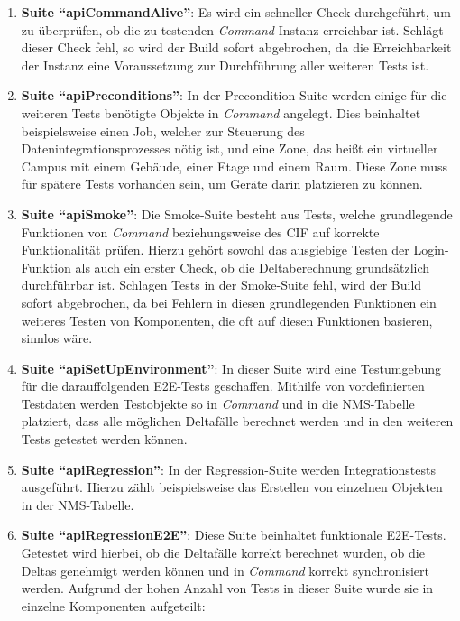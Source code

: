 \begin{enumerate}
    \item \textbf{Suite \enquote{apiCommandAlive}}: Es wird ein schneller Check durchgeführt, um zu überprüfen, ob die zu testenden \textit{Command}-Instanz erreichbar ist. Schlägt dieser Check fehl, so wird der Build sofort abgebrochen, da die Erreichbarkeit der Instanz eine Voraussetzung zur Durchführung aller weiteren Tests ist.
    \item \textbf{Suite \enquote{apiPreconditions}}: In der Precondition-Suite werden einige für die weiteren Tests benötigte Objekte in \textit{Command} angelegt. Dies beinhaltet beispielsweise einen Job, welcher zur Steuerung des Datenintegrationsprozesses nötig ist, und eine Zone, das heißt ein virtueller Campus mit einem Gebäude, einer Etage und einem Raum. Diese Zone muss für spätere Tests vorhanden sein, um Geräte darin platzieren zu können.
    \item \textbf{Suite \enquote{apiSmoke}}: Die Smoke-Suite besteht aus Tests, welche grundlegende Funktionen von \textit{Command} beziehungsweise des \ac{CIF} auf korrekte Funktionalität prüfen. Hierzu gehört sowohl das ausgiebige Testen der Login-Funktion als auch ein erster Check, ob die Deltaberechnung grundsätzlich durchführbar ist. Schlagen Tests in der Smoke-Suite fehl, wird der Build sofort abgebrochen, da bei Fehlern in diesen grundlegenden Funktionen ein weiteres Testen von Komponenten, die oft auf diesen Funktionen basieren, sinnlos wäre.
    \item \textbf{Suite \enquote{apiSetUpEnvironment}}: In dieser Suite wird eine Testumgebung für die darauffolgenden \ac{E2E}-Tests geschaffen. Mithilfe von vordefinierten Testdaten werden Testobjekte so in \textit{Command} und in die \ac{NMS}-Tabelle platziert, dass alle möglichen Deltafälle berechnet werden und in den weiteren Tests getestet werden können.
    \item \textbf{Suite \enquote{apiRegression}}: In der Regression-Suite werden Integrationstests ausgeführt. Hierzu zählt beispielsweise das Erstellen von einzelnen Objekten in der \ac{NMS}-Tabelle.
    \item \textbf{Suite \enquote{apiRegressionE2E}}: Diese Suite beinhaltet funktionale \ac{E2E}-Tests. Getestet wird hierbei, ob die Deltafälle korrekt berechnet wurden, ob die Deltas genehmigt werden können und in \textit{Command} korrekt synchronisiert werden. Aufgrund der hohen Anzahl von Tests in dieser Suite wurde sie in einzelne Komponenten aufgeteilt:
    \begin{description}

\end{description}
\end{enumerate}
